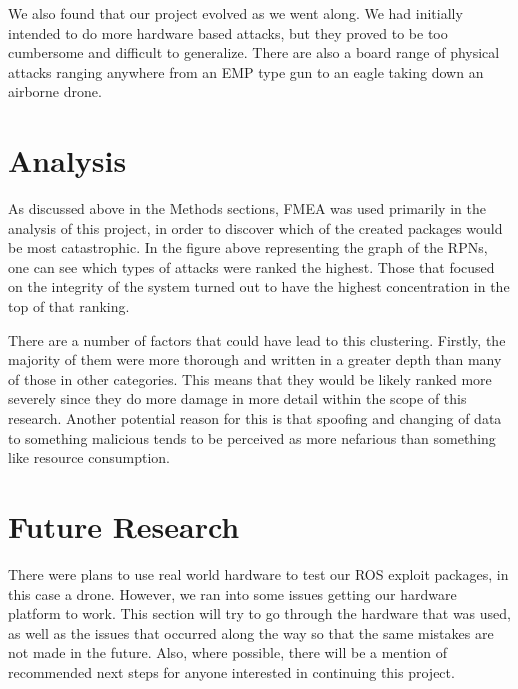 \documentclass[IEEEtran,letterpaper,10pt,notitlepage,draftclsnofoot]{article}
\begin{document}
We also found that our project evolved as we went along.
We had initially intended to do more hardware based attacks, but they proved to be too cumbersome and difficult to generalize.
There are also a board range of physical attacks ranging anywhere from an EMP type gun to an eagle taking down an airborne drone.

\section{Analysis}
As discussed above in the Methods sections, FMEA was used primarily in the analysis of this project, in order to discover which of the created packages would be most catastrophic.
In the figure above representing the graph of the RPNs, one can see which types of attacks were ranked the highest.
Those that focused on the integrity of the system turned out to have the highest concentration in the top of that ranking.

There are a number of factors that could have lead to this clustering.
Firstly, the majority of them were more thorough and written in a greater depth than many of those in other categories.
This means that they would be likely ranked more severely since they do more damage in more detail within the scope of this research.
Another potential reason for this is that spoofing and changing of data to something malicious tends to be perceived as more nefarious than something like resource consumption.

\section{Future Research}


There were plans to use real world hardware to test our ROS exploit packages, in this case a drone. However,
we ran into some issues getting our hardware platform to work. This section will try to go through the
hardware that was used, as well as the issues that occurred along the way so that the same mistakes are not
made in the future. Also, where possible, there will be a mention of recommended next steps for anyone
interested in continuing this project.
\end{document}
